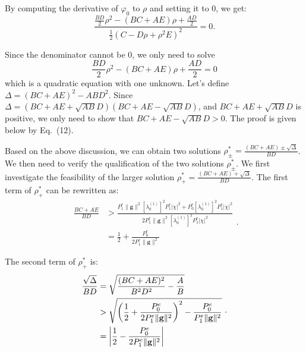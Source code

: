 \documentclass[10pt, conference, letterpaper]{IEEEtran}
\begin{document}
By computing the derivative of $\varphi_{0}$ to $\rho$ and setting it to $0$, we get:
\setcounter{equation}{9}
\begin{equation}
\frac{\frac{BD}{2}\rho^2-(BC+AE)\rho+\frac{AD}{2}}{\frac{1}{2}(C-D\rho+\rho^2E)^2}=0.
\end{equation}

Since the denominator cannot be $0$, we only need to solve
\begin{equation}
\frac{BD}{2}\rho^2-(BC+AE)\rho+\frac{AD}{2}=0
\end{equation}
which is a quadratic equation with one unknown.
Let's define $\Delta=(BC+AE)^{2}-ABD^{2}$.
Since $\Delta=(BC+AE+\sqrt{AB}D)(BC+AE-\sqrt{AB}D)$,
and $BC+AE+\sqrt{AB}D$ is positive, we only need to show that
$BC+AE-\sqrt{AB}D>0$. The proof is given below by Eq.~(12).

Based on the above discussion,
we can obtain two solutions $\rho_{\pm}^{*}=\frac{(BC+AE)\pm\sqrt{\Delta}}{BD}$.
We then need to verify the qualification of the two solutions $\rho_{\pm}^{*}$.
We first investigate the feasibility of the larger solution
$\rho_{+}^{*}=\frac{(BC+AE)+\sqrt{\Delta}}{BD}$.
The first term of $\rho_{+}^{*}$ can be rewritten as:
\setcounter{equation}{12}
\begin{equation}
\begin{aligned}
\frac{BC+AE}{BD}&>\frac{P^{e}_{1}\|\mathbf{g}\|^{2}[\lambda^{(1)}_{0}]^{2}P^{e}_{1}|\chi|^{2}+P^{e}_{0}
[\lambda^{(1)}_{0}]^{2}P^{e}_{1}|\chi|^{2}}
{2P^{e}_{1}\|\mathbf{g}\|^{2}[\lambda^{(1)}_{0}]^{2}P^{e}_{1}|\chi|^{2}}\\
&=\frac{1}{2}+\frac{P^{e}_{0}}{2P^{e}_{1}\|\mathbf{g}\|^{2}}
\end{aligned}.
\end{equation}

The second term of $\rho_{+}^{*}$ is:
\begin{equation}
\begin{aligned}
\frac{\sqrt{\Delta}}{BD}&=\sqrt{\frac{(BC+AE)^{2}}{B^2D^2}-\frac{A}{B}}\\
&>\sqrt{\left(\frac{1}{2}+\frac{P^{e}_{0}}{2P^{e}_{1}\|\mathbf{g}\|^{2}}\right)^{2}-
\frac{P^{e}_{0}}{P^{e}_{1}\|\mathbf{g}\|^{2}}}\\
&=\left|\frac{1}{2}-\frac{P^{e}_{0}}{2P^{e}_{1}\|\mathbf{g}\|^{2}}\right|
\end{aligned}~.
\vspace*{-0.05in}
\end{equation}
\end{document}
